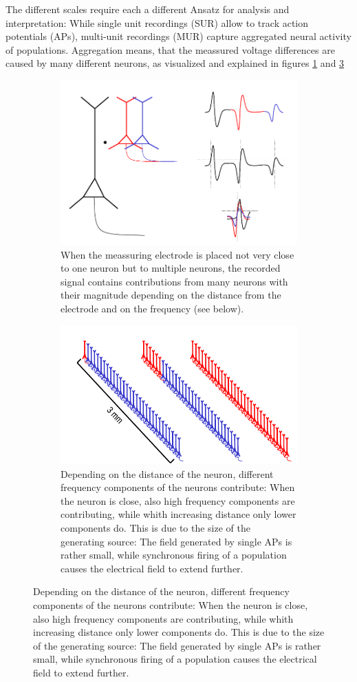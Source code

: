 \documentclass[11pt, twocolumn]{article}
\begin{document}
        The different scales require each a different Ansatz for analysis and interpretation:
        While single unit recordings (SUR) allow to track action potentials (APs), multi-unit recordings (MUR) capture aggregated neural activity of populations. Aggregation means, that the meassured voltage differences are caused by many different neurons, as visualized and explained in figures \ref{mur} and \ref{origins}
        \begin{figure}
        \begin{subfigure}{0.45\textwidth}
         \includegraphics[keepaspectratio, width=\linewidth]{img/2_lfp_mur.png}
         \caption{When the meassuring electrode is placed not very close to one neuron but to multiple neurons, the recorded signal contains contributions from many neurons with their magnitude depending on the distance from the electrode and on the frequency (see below).}\label{mur}
        \end{subfigure}
         \begin{subfigure}{0.45\textwidth}
          \includegraphics[keepaspectratio, width=\linewidth]{img/2_lfp_origins.png}
          \caption{Depending on the distance of the neuron, different frequency components of the neurons contribute: When the neuron is close, also high frequency components are contributing, while whith increasing distance only lower components do. This is due to the size of the generating source: The field generated by single APs is rather small, while synchronous firing of a population causes the electrical field to extend further.}\label{origins}
         \end{subfigure}
        \end{figure}
\end{document}
